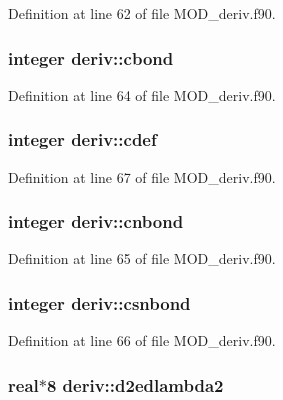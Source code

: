 Definition at line 62 of file M\-O\-D\-\_\-deriv.\-f90.

\hypertarget{classderiv_a0b8a51deb62686afaf894dc2771d3f96}{
\subsubsection[{cbond}]{\setlength{\rightskip}{0pt plus 5cm}integer deriv\-::cbond}}\label{classderiv_a0b8a51deb62686afaf894dc2771d3f96}


Definition at line 64 of file M\-O\-D\-\_\-deriv.\-f90.

\hypertarget{classderiv_a98f20bbbc3420f6e39561ff8359236a3}{
\subsubsection[{cdef}]{\setlength{\rightskip}{0pt plus 5cm}integer deriv\-::cdef}}\label{classderiv_a98f20bbbc3420f6e39561ff8359236a3}


Definition at line 67 of file M\-O\-D\-\_\-deriv.\-f90.

\hypertarget{classderiv_ad5a3f700aabda87e1aaf6a909fb302b0}{
\subsubsection[{cnbond}]{\setlength{\rightskip}{0pt plus 5cm}integer deriv\-::cnbond}}\label{classderiv_ad5a3f700aabda87e1aaf6a909fb302b0}


Definition at line 65 of file M\-O\-D\-\_\-deriv.\-f90.

\hypertarget{classderiv_abd64d215e4270616603172d7e59a2044}{
\subsubsection[{csnbond}]{\setlength{\rightskip}{0pt plus 5cm}integer deriv\-::csnbond}}\label{classderiv_abd64d215e4270616603172d7e59a2044}


Definition at line 66 of file M\-O\-D\-\_\-deriv.\-f90.

\hypertarget{classderiv_affaa0b9e69d073a2e87bdf2af4e87d1b}{
\subsubsection[{d2edlambda2}]{\setlength{\rightskip}{0pt plus 5cm}real$\ast$8 deriv\-::d2edlambda2}}\label{classderiv_affaa0b9e69d073a2e87bdf2af4e87d1b}


